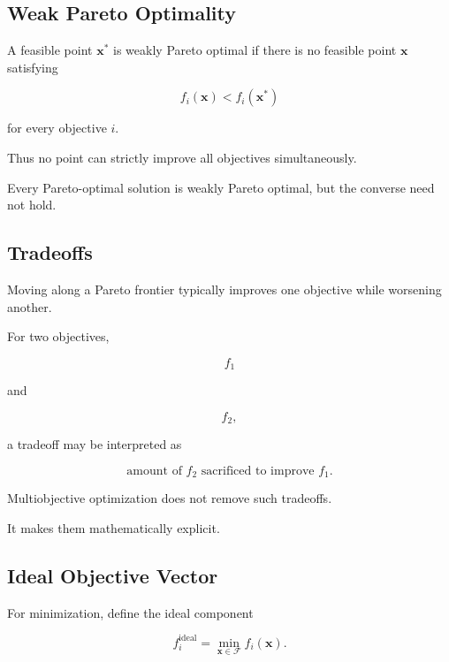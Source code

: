 \subsection{Weak Pareto Optimality}
\label{subsec:weak-pareto-optimality}

A feasible point \(\mathbf{x}^*\) is weakly Pareto optimal if there is no
feasible point \(\mathbf{x}\) satisfying

\[
\boxed{
f_i(\mathbf{x})
<
f_i(\mathbf{x}^*)
}
\]

for every objective \(i\).

Thus no point can strictly improve all objectives simultaneously.

Every Pareto-optimal solution is weakly Pareto optimal, but the converse
need not hold.

\subsection{Tradeoffs}
\label{subsec:multiobjective-tradeoffs}

Moving along a Pareto frontier typically improves one objective while
worsening another.

For two objectives,

\[
f_1
\]

and

\[
f_2,
\]

a tradeoff may be interpreted as

\[
\boxed{
\text{amount of }f_2
\text{ sacrificed to improve }f_1.
}
\]

Multiobjective optimization does not remove such tradeoffs.

It makes them mathematically explicit.

\subsection{Ideal Objective Vector}
\label{subsec:ideal-objective-vector}

For minimization, define the ideal component

\[
\boxed{
f_i^{\mathrm{ideal}}
=
\min_{\mathbf{x}\in\mathcal{F}}
f_i(\mathbf{x}).
}
\]

